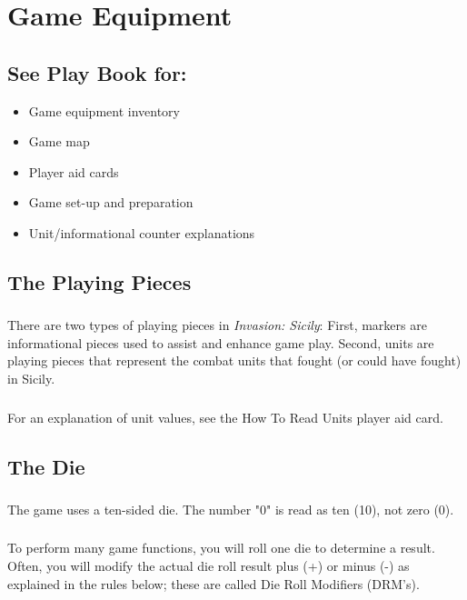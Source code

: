 \section{Game Equipment}

\subsection{See Play Book for:}
\begin{itemize}
    \item Game equipment inventory
    \item Game map
    \item Player aid cards
    \item Game set-up and preparation
    \item Unit/informational counter explanations
\end{itemize}

\subsection{The Playing Pieces}

\par
\subsubsection{}
There are two types of playing pieces in \textit{Invasion: Sicily}: First, markers are informational pieces used to assist and enhance game play. Second, units are playing pieces that represent the combat units that fought (or could have fought) in Sicily.

\subsubsection{}
For an explanation of unit values, see the How To Read Units player aid card.

\subsection{The Die}

\subsubsection{}
The game uses a ten-sided die. The number "0" is read as ten (10), not zero (0).

\subsubsection{}
To perform many game functions, you will roll one die to determine a result. Often, you will modify the actual die roll result plus (+) or minus (-) as explained in the rules below; these are called Die Roll Modifiers (DRM's).